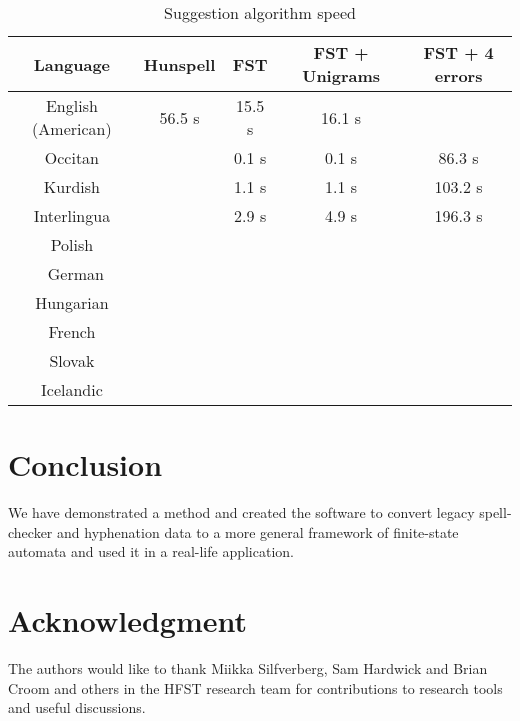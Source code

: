 \documentclass[postprint]{flammie}
\begin{document}
\begin{table}[tbp]
  \caption{Suggestion algorithm speed}
  \label{table:error-analysis}
  \centering
  \begin{tabular}{ccccc}
    \hline
    \textbf{Language} & \textbf{Hunspell} & \textbf{FST} & \textbf{FST + Unigrams} & \textbf{FST + 4 errors} \\
    \hline
    \hline
    English (American) & 56.5 s & 15.5 s & 16.1 s &  \\
    Occitan & & 0.1 s & 0.1 s & 86.3 s \\
    Kurdish & & 1.1 s & 1.1 s & 103.2 s \\
    Interlingua & & 2.9 s & 4.9 s & 196.3 s \\
    Polish & & & & \\\
    German & & & & \\
    Hungarian & & & & \\
    French & \\
    Slovak & \\
    Icelandic & \\
    \hline
  \end{tabular}
\end{table}

\section{Conclusion}

We have demonstrated a method and created the software to convert legacy
spell-checker and hyphenation data to a more general framework of
finite-state automata and used it in a real-life application.

\section*{Acknowledgment}

The authors would like to thank Miikka Silfverberg, Sam Hardwick and Brian
Croom and others in the HFST research team for contributions to research tools
and useful discussions.




\end{document}
